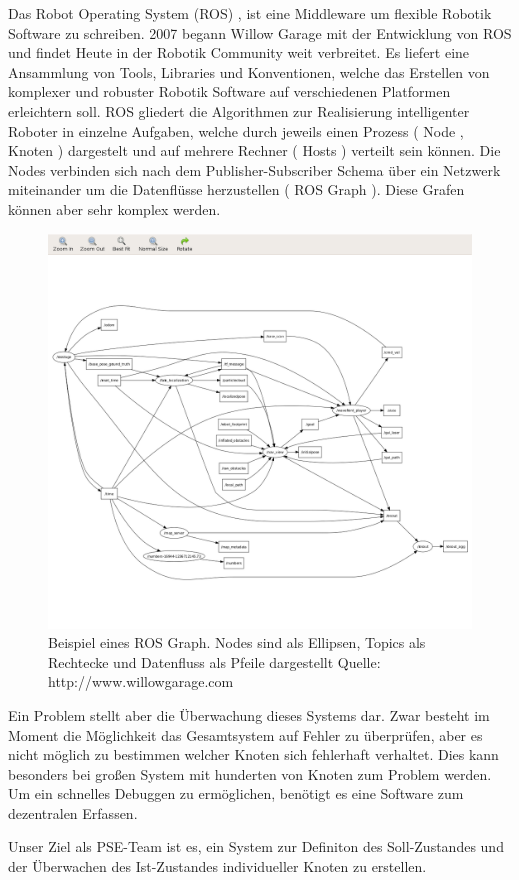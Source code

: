 

\vspace{2cm}

Das Robot Operating System (ROS) , ist eine Middleware um flexible Robotik Software zu schreiben. 2007 begann Willow Garage mit der Entwicklung von ROS und findet Heute in der Robotik Community weit verbreitet.
 Es liefert eine Ansammlung von Tools, Libraries und Konventionen, welche das Erstellen von komplexer und robuster Robotik Software auf verschiedenen Platformen erleichtern soll.
ROS gliedert die Algorithmen zur Realisierung intelligenter Roboter in einzelne Aufgaben, welche durch jeweils einen Prozess ( Node ,  Knoten ) dargestelt und auf mehrere Rechner ( Hosts ) verteilt sein können.
Die Nodes verbinden sich nach dem Publisher-Subscriber Schema über ein Netzwerk miteinander um die Datenflüsse herzustellen ( ROS Graph ).
Diese Grafen können aber sehr komplex werden.

\begin{figure}[H]
\centering
\includegraphics[scale=0.25]{./bilder/rxgraph.png} 
\caption{Beispiel eines ROS Graph. Nodes sind als Ellipsen, Topics als Rechtecke und Datenfluss als Pfeile dargestellt
		Quelle: http://www.willowgarage.com }
\end{figure}

Ein Problem stellt aber die Überwachung dieses Systems dar. Zwar besteht im Moment die Möglichkeit das Gesamtsystem auf Fehler zu überprüfen, aber es nicht möglich zu bestimmen 
welcher Knoten sich fehlerhaft verhaltet. Dies kann besonders bei großen System mit hunderten von Knoten zum Problem werden. Um ein schnelles Debuggen zu ermöglichen, benötigt es
eine Software zum dezentralen Erfassen.


\vspace{0.5cm}

Unser Ziel als PSE-Team ist es, ein System zur Definiton des Soll-Zustandes und der Überwachen des Ist-Zustandes individueller Knoten zu erstellen.